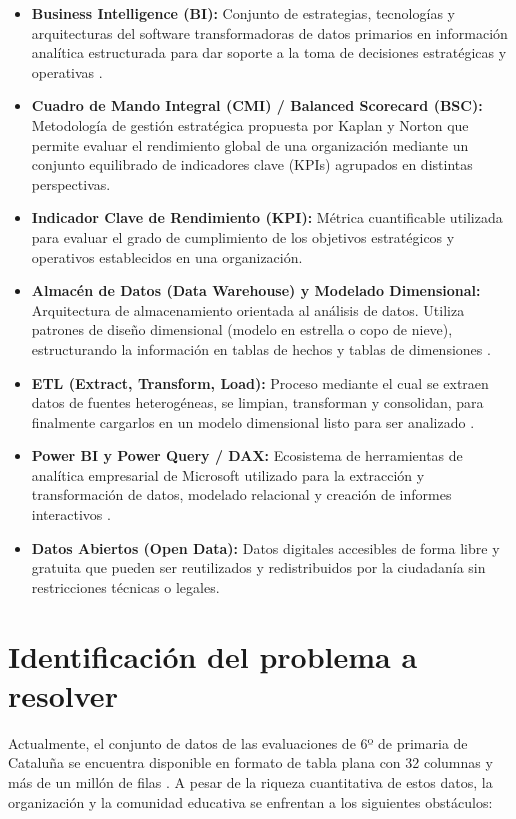 \documentclass[12pt, a4paper, twoside]{report}
\begin{document}
\begin{itemize}
    \item \textbf{Business Intelligence (BI):} Conjunto de estrategias, tecnologías y arquitecturas del software transformadoras de datos primarios en información analítica estructurada para dar soporte a la toma de decisiones estratégicas y operativas \cite{turban2014business}.
    \item \textbf{Cuadro de Mando Integral (CMI) / Balanced Scorecard (BSC):} Metodología de gestión estratégica propuesta por Kaplan y Norton \cite{kaplan1992balanced} que permite evaluar el rendimiento global de una organización mediante un conjunto equilibrado de indicadores clave (KPIs) agrupados en distintas perspectivas.
    \item \textbf{Indicador Clave de Rendimiento (KPI):} Métrica cuantificable utilizada para evaluar el grado de cumplimiento de los objetivos estratégicos y operativos establecidos en una organización.
    \item \textbf{Almacén de Datos (Data Warehouse) y Modelado Dimensional:} Arquitectura de almacenamiento orientada al análisis de datos. Utiliza patrones de diseño dimensional (modelo en estrella o copo de nieve), estructurando la información en tablas de hechos y tablas de dimensiones \cite{kimball2013data}.
    \item \textbf{ETL (Extract, Transform, Load):} Proceso mediante el cual se extraen datos de fuentes heterogéneas, se limpian, transforman y consolidan, para finalmente cargarlos en un modelo dimensional listo para ser analizado \cite{kimball2013data}.
    \item \textbf{Power BI y Power Query / DAX:} Ecosistema de herramientas de analítica empresarial de Microsoft utilizado para la extracción y transformación de datos, modelado relacional y creación de informes interactivos \cite{ferrari2016definitive}.
    \item \textbf{Datos Abiertos (Open Data):} Datos digitales accesibles de forma libre y gratuita que pueden ser reutilizados y redistribuidos por la ciudadanía sin restricciones técnicas o legales.
\end{itemize}

\section{Identificación del problema a resolver}
Actualmente, el conjunto de datos de las evaluaciones de 6º de primaria de Cataluña se encuentra disponible en formato de tabla plana con 32 columnas y más de un millón de filas \cite{transparencia_catalunya_2024}. A pesar de la riqueza cuantitativa de estos datos, la organización y la comunidad educativa se enfrentan a los siguientes obstáculos:
\end{document}
